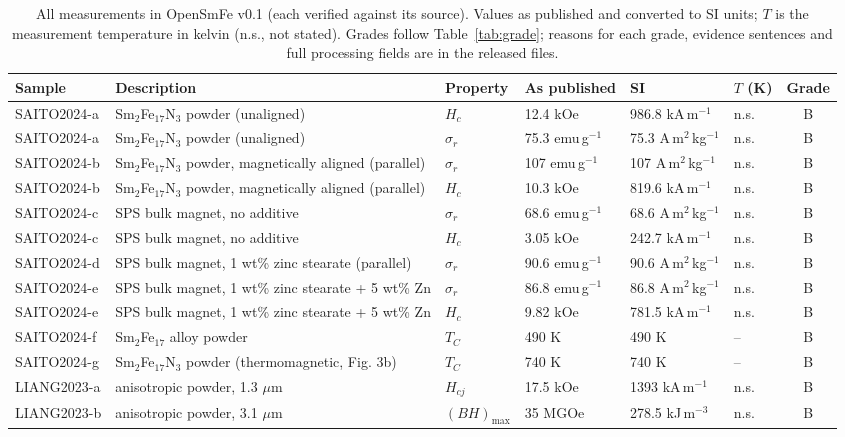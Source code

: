 \documentclass[10pt,twocolumn,letterpaper]{article}
\begin{document}
\begin{table}[t]
\caption{All measurements in OpenSmFe v0.1 (each verified against its source). Values as published and converted to SI units; $T$ is the measurement temperature in kelvin (n.s., not stated). Grades follow Table~\ref{tab:grade}; reasons for each grade, evidence sentences and full processing fields are in the released files.}
\label{tab:meas}
\footnotesize
\begin{tabular}{@{}llllllc@{}}
\toprule
Sample & Description & Property & As published & SI & $T$ (K) & Grade \\
\midrule
SAITO2024-a & Sm$_{2}$Fe$_{17}$N$_{3}$ powder (unaligned) & $H_c$ & 12.4 kOe & 986.8 kA\,m$^{-1}$ & n.s. & B \\
SAITO2024-a & Sm$_{2}$Fe$_{17}$N$_{3}$ powder (unaligned) & $\sigma_r$ & 75.3 emu\,g$^{-1}$ & 75.3 A\,m$^2$\,kg$^{-1}$ & n.s. & B \\
SAITO2024-b & Sm$_{2}$Fe$_{17}$N$_{3}$ powder, magnetically aligned (parallel) & $\sigma_r$ & 107 emu\,g$^{-1}$ & 107 A\,m$^2$\,kg$^{-1}$ & n.s. & B \\
SAITO2024-b & Sm$_{2}$Fe$_{17}$N$_{3}$ powder, magnetically aligned (parallel) & $H_c$ & 10.3 kOe & 819.6 kA\,m$^{-1}$ & n.s. & B \\
SAITO2024-c & SPS bulk magnet, no additive & $\sigma_r$ & 68.6 emu\,g$^{-1}$ & 68.6 A\,m$^2$\,kg$^{-1}$ & n.s. & B \\
SAITO2024-c & SPS bulk magnet, no additive & $H_c$ & 3.05 kOe & 242.7 kA\,m$^{-1}$ & n.s. & B \\
SAITO2024-d & SPS bulk magnet, 1 wt\% zinc stearate (parallel) & $\sigma_r$ & 90.6 emu\,g$^{-1}$ & 90.6 A\,m$^2$\,kg$^{-1}$ & n.s. & B \\
SAITO2024-e & SPS bulk magnet, 1 wt\% zinc stearate + 5 wt\% Zn & $\sigma_r$ & 86.8 emu\,g$^{-1}$ & 86.8 A\,m$^2$\,kg$^{-1}$ & n.s. & B \\
SAITO2024-e & SPS bulk magnet, 1 wt\% zinc stearate + 5 wt\% Zn & $H_c$ & 9.82 kOe & 781.5 kA\,m$^{-1}$ & n.s. & B \\
SAITO2024-f & Sm$_{2}$Fe$_{17}$ alloy powder & $T_C$ & 490 K & 490 K & -- & B \\
SAITO2024-g & Sm$_{2}$Fe$_{17}$N$_{3}$ powder (thermomagnetic, Fig. 3b) & $T_C$ & 740 K & 740 K & -- & B \\
LIANG2023-a & anisotropic powder, 1.3 $\mu$m & $H_{cj}$ & 17.5 kOe & 1393 kA\,m$^{-1}$ & n.s. & B \\
LIANG2023-b & anisotropic powder, 3.1 $\mu$m & $(BH)_{\max}$ & 35 MGOe & 278.5 kJ\,m$^{-3}$ & n.s. & B \\

\end{tabular}
\end{table}
\end{document}
